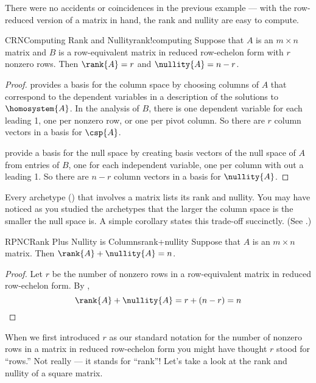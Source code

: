 %
There were no accidents or coincidences in the previous example --- with the row-reduced version of a matrix in hand, the rank and nullity are easy to compute.
%
\begin{theorem}{CRN}{Computing Rank and Nullity}{rank!computing}
Suppose that $A$ is an $m\times n$ matrix and $B$ is a row-equivalent matrix in reduced row-echelon form with $r$ nonzero rows.  Then $\rank{A}=r$ and $\nullity{A}=n-r$.
\end{theorem}
%
\begin{proof}
 provides a basis for the column space by choosing columns of $A$ that correspond to the dependent variables in a description of the solutions to $\homosystem{A}$.  In the analysis of $B$, there is one dependent variable for each leading 1, one per nonzero row, or one per pivot column.  So there are $r$ column vectors in a basis for $\csp{A}$.\par
%
 provide a basis for the null space by creating basis vectors of the null space of $A$ from entries of $B$, one for each independent variable, one per column with out a leading 1.  So there are $n-r$ column vectors in a basis for $\nullity{A}$.\par
%
\end{proof}
%
Every archetype () that involves a matrix lists its rank and nullity.  You may have noticed as you studied the archetypes that the larger the column space is the smaller the null space is.  A simple corollary states this trade-off succinctly.    (See .)
%
\begin{theorem}{RPNC}{Rank Plus Nullity is Columns}{rank+nullity}
Suppose that $A$ is an $m\times n$ matrix.  Then $\rank{A}+\nullity{A}=n$.
\end{theorem}
%
\begin{proof}
Let $r$ be the number of nonzero rows in a row-equivalent matrix in reduced row-echelon form.
By ,
%
\begin{equation*}
\rank{A}+\nullity{A}= r+(n-r)=n
\end{equation*}
%
\end{proof}
%
When we first introduced $r$ as our standard notation for the number of nonzero rows in a matrix in reduced row-echelon form you might have thought $r$ stood for ``rows.''  Not really --- it stands for ``rank''!
%
%
Let's take a look at the rank and nullity of a square matrix.
